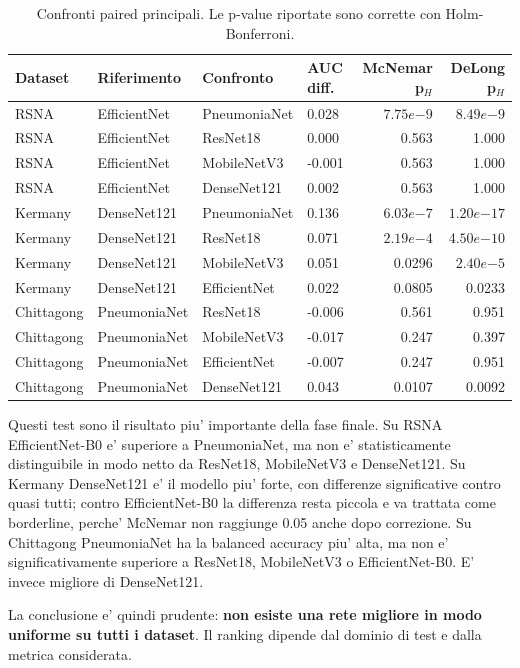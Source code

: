 \documentclass[11pt,a4paper]{article}
\newcommand{\balacc}{balanced accuracy}
\begin{document}
\begin{table}[H]
\centering
\caption{Confronti paired principali. Le p-value riportate sono corrette con Holm-Bonferroni.}
\begin{tabular}{llllrr}
\toprule
Dataset & Riferimento & Confronto & AUC diff. & McNemar p$_H$ & DeLong p$_H$ \\
\midrule
RSNA & EfficientNet & PneumoniaNet & 0.028 & $7.75e{-9}$ & $8.49e{-9}$ \\
RSNA & EfficientNet & ResNet18 & 0.000 & 0.563 & 1.000 \\
RSNA & EfficientNet & MobileNetV3 & -0.001 & 0.563 & 1.000 \\
RSNA & EfficientNet & DenseNet121 & 0.002 & 0.563 & 1.000 \\
\midrule
Kermany & DenseNet121 & PneumoniaNet & 0.136 & $6.03e{-7}$ & $1.20e{-17}$ \\
Kermany & DenseNet121 & ResNet18 & 0.071 & $2.19e{-4}$ & $4.50e{-10}$ \\
Kermany & DenseNet121 & MobileNetV3 & 0.051 & 0.0296 & $2.40e{-5}$ \\
Kermany & DenseNet121 & EfficientNet & 0.022 & 0.0805 & 0.0233 \\
\midrule
Chittagong & PneumoniaNet & ResNet18 & -0.006 & 0.561 & 0.951 \\
Chittagong & PneumoniaNet & MobileNetV3 & -0.017 & 0.247 & 0.397 \\
Chittagong & PneumoniaNet & EfficientNet & -0.007 & 0.247 & 0.951 \\
Chittagong & PneumoniaNet & DenseNet121 & 0.043 & 0.0107 & 0.0092 \\
\bottomrule
\end{tabular}
\end{table}

Questi test sono il risultato piu' importante della fase finale. Su RSNA
EfficientNet-B0 e' superiore a PneumoniaNet, ma non e' statisticamente
distinguibile in modo netto da ResNet18, MobileNetV3 e DenseNet121. Su Kermany
DenseNet121 e' il modello piu' forte, con differenze significative contro quasi
tutti; contro EfficientNet-B0 la differenza resta piccola e va trattata come
borderline, perche' McNemar non raggiunge 0.05 anche dopo correzione. Su
Chittagong PneumoniaNet ha la \balacc{} piu' alta, ma non e' significativamente
superiore a ResNet18, MobileNetV3 o EfficientNet-B0. E' invece migliore di
DenseNet121.

La conclusione e' quindi prudente: \textbf{non esiste una rete migliore in modo
uniforme su tutti i dataset}. Il ranking dipende dal dominio di test e dalla
metrica considerata.
\end{document}
